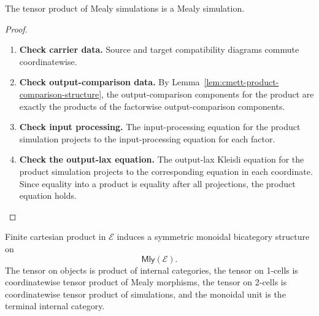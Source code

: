 \begin{lemma}
\label{lem:cmett-products-simulations}
    The tensor product of Mealy simulations is a Mealy simulation.
\end{lemma}

\begin{proof}
    \leavevmode
    \begin{enumerate}
        \item \textbf{Check carrier data.}
        Source and target compatibility diagrams commute coordinatewise.

        \item \textbf{Check output-comparison data.}
        By Lemma~\ref{lem:cmett-product-comparison-structure}, the
        output-comparison components for the product are exactly the products
        of the factorwise output-comparison components.

        \item \textbf{Check input processing.}
        The input-processing equation for the product simulation projects to
        the input-processing equation for each factor.

        \item \textbf{Check the output-lax equation.}
        The output-lax Kleisli equation for the product simulation projects
        to the corresponding equation in each coordinate. Since equality into
        a product is equality after all projections, the product equation
        holds.
    \end{enumerate}
\end{proof}

\begin{theorem}
\label{thm:cmett-symmetric-monoidal-mly}
    Finite cartesian product in \(\mathcal E\) induces a symmetric monoidal
    bicategory structure on
    \[
        \mathsf{Mly}(\mathcal E).
    \]
    The tensor on objects is product of internal categories, the tensor on
    1-cells is coordinatewise tensor product of Mealy morphisms, the tensor on
    2-cells is coordinatewise tensor product of simulations, and the monoidal
    unit is the terminal internal category.
\end{theorem}

